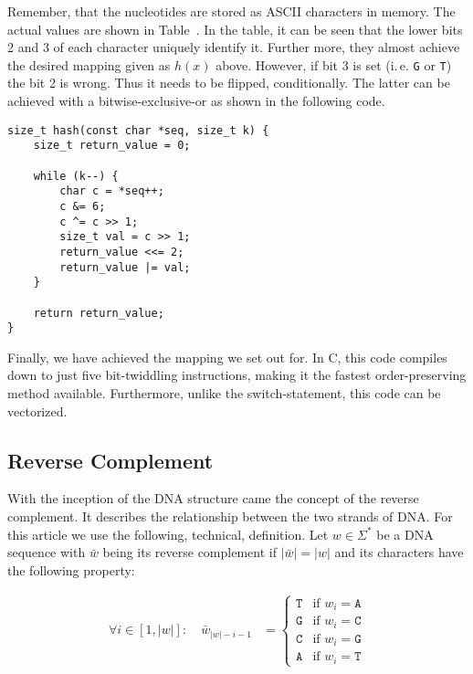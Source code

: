 \documentclass[10pt,letterpaper]{article}
\begin{document}
Remember, that the nucleotides are stored as ASCII characters in memory. The actual values are shown in Table~{}. In the table, it can be seen that the lower bits 2 and 3 of each character uniquely identify it. Further more, they almost achieve the desired mapping given as $h(x)$ above. However, if bit 3 is set (i.\,e. \lstinline!G! or \lstinline!T!) the bit 2 is wrong. Thus it needs to be flipped, conditionally. The latter can be achieved with a bitwise-exclusive-or as shown in the following code.

\begin{lstlisting}
size_t hash(const char *seq, size_t k) {  
    size_t return_value = 0;

    while (k--) {
    	char c = *seq++;
    	c &= 6;
    	c ^= c >> 1;
    	size_t val = c >> 1;
    	return_value <<= 2;
    	return_value |= val;
    }

    return return_value;
}
\end{lstlisting}

Finally, we have achieved the mapping we set out for. In C, this code compiles down to just five bit-twiddling instructions, making it the fastest order-preserving method available. Furthermore, unlike the switch-statement, this code can be vectorized.


\subsection{Reverse Complement}
\label{sec:revcomp}

With the inception of the DNA structure came the concept of the reverse complement. It describes the relationship between the two strands of DNA. For this article we use the following, technical, definition. Let $w\in \Sigma^*$ be a DNA sequence with $\bar w$ being its reverse complement if $|\bar w| = |w|$ and its characters have the following property:

\begin{align*}
	\forall i\in[1,|w|]\colon \quad {\bar w}_{|w|-i-1} &=
		\begin{cases}
			\texttt{T} & \text{if } w_i = \texttt{A} \\
			\texttt{G} & \text{if } w_i = \texttt{C} \\
			\texttt{C} & \text{if } w_i = \texttt{G} \\
			\texttt{A} & \text{if } w_i = \texttt{T}
		\end{cases}
\end{align*}
\end{document}
